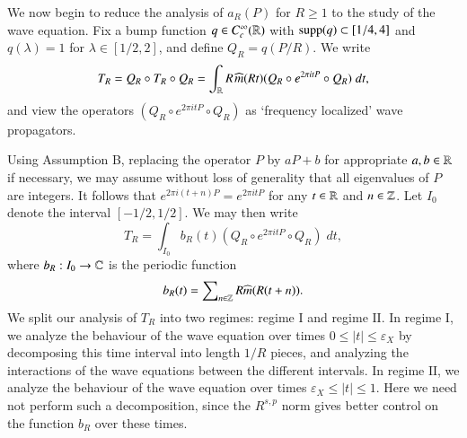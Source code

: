 We now begin to reduce the analysis of $a_R(P)$ for $R \geq 1$ to the study of the wave equation. Fix a bump function $q \in C_c^\infty(\operatorname{\mathbb{R}})$ with $\operatorname{\text{supp}}(q) \subset [1/4,4]$ and $q(\lambda) = 1$ for $\lambda \in [1/2,2]$, and define $Q_R = q(P/R)$. %
We write
%
\begin{equation}
    T_R = Q_R \circ T_R \circ Q_R = \int_{\operatorname{\mathbb{R}}} R\;\! \widehat{m}(R t) (Q_R \circ e^{2 \pi i t P} \circ Q_R)\; dt,
\end{equation}
%
and view the operators $(Q_R \circ e^{2 \pi i t P} \circ Q_R)$ as `frequency localized' wave propagators.

Using Assumption B, replacing the operator $P$ by $aP + b$ for appropriate $a,b \in \operatorname{\mathbb{R}}$ if necessary, we may assume without loss of generality that all eigenvalues of $P$ are integers. It follows that $e^{2 \pi i (t + n) P} = e^{2 \pi i t P}$ for any $t \in \operatorname{\mathbb{R}}$ and $n \in \operatorname{\mathbb{Z}}$. Let $I_0$ denote the interval $[-1/2,1/2]$. We may then write
%
\begin{equation}
    T_R = \int_{I_0} b_R(t) (Q_R \circ e^{2 \pi i tP} \circ Q_R)\; dt,
\end{equation}
%
where $b_R: I_0 \to \operatorname{\mathbb{C}}$ is the periodic function
%
\begin{equation}
    b_R(t) = \sum\nolimits_{n \in \operatorname{\mathbb{Z}}} R \widehat{m}(R (t + n)).
\end{equation}
We split our analysis of $T_R$ into two regimes: regime $\text{I}$ and regime $\text{II}$. In regime $\text{I}$, we analyze the behaviour of the wave equation over times $0 \leq |t| \leq \varepsilon_X$ by decomposing this time interval into length $1/R$ pieces, and analyzing the interactions of the wave equations between the different intervals. In regime $\text{II}$, we analyze the behaviour of the wave equation over times $\varepsilon_X \leq |t| \leq 1$. Here we need not perform such a decomposition, since the $R^{s,p}$ norm gives better control on the function $b_R$ over these times.

